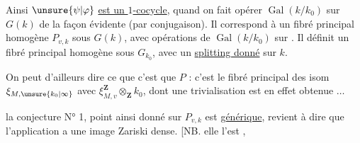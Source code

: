 Ainsi $\unsure{\psi|\varphi}$ \uline{est un $1$-cocycle}, quand on fait opérer $\operatorname{Gal}(k/k_0)$ sur $G(k)$ de la façon évidente (par conjugaison). Il correspond à un fibré principal homogène $P_{v,k}$ sous $G(k)$, avec opérations de $\operatorname{Gal}(k/k_0)$ sur . Il définit  un fibré principal homogène  sous $G_{k_0}$, avec un \uline{splitting donné} sur $k$.

On peut d'ailleurs dire ce que c'est que $P$ : c'est le fibré principal des isom  $\xi_{M,\unsure{k_0|\infty}}$ avec $\xi_{M,v}^{\mathbf Z}\otimes_{\mathbf Z}k_0$, dont une trivialisation est en effet obtenue $\ldots$

 la conjecture  N° 1,   point ainsi donné sur $P_{v,k}$ est \uline{générique}, revient à dire que l'application
 a une image Zariski dense. [NB. elle l'est ,
